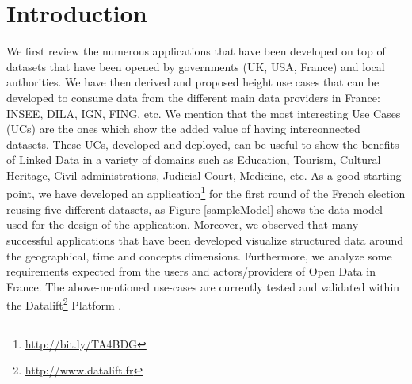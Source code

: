 \documentclass[a4paper,11pt]{report}
\begin{document}
\section{Introduction}
We first review the numerous applications that have been developed on top of datasets that have been opened by governments (UK, USA, France) and local authorities. We have then derived and proposed height use cases  that can be developed to consume data from the different main data providers in France: INSEE, DILA, IGN, FING, etc. We mention that the most interesting Use Cases (UCs) are the ones which show the added value of having interconnected datasets. These UCs,  developed and deployed, can be useful to show the benefits of Linked Data in a variety of domains such as Education, Tourism, Cultural Heritage, Civil administrations, Judicial Court, Medicine, etc. As a good starting point, we have developed an application\footnote{\url{http://bit.ly/TA4BDG}} for the first round of the French election reusing five different datasets, as Figure \ref{sampleModel} shows the data model used for the design of the application. Moreover, we observed that many successful applications that have been developed visualize structured data around the geographical, time and concepts dimensions. Furthermore, we analyze some requirements expected from the users and actors/providers of Open Data in France. The above-mentioned use-cases are currently tested and validated within the Datalift\footnote{\url{http://www.datalift.fr}} Platform \cite{datalift2012}.
\end{document}
